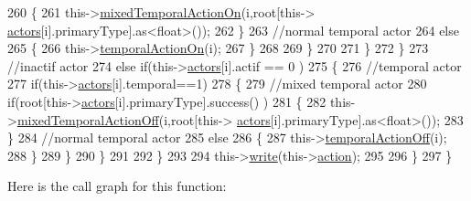 \begin{DoxyCode}
260                         \{
261                             this->\hyperlink{class_jetpack_af44bc8a08818e4433dfb1c7104601f12}{mixedTemporalActionOn}(i,root[this->
      \hyperlink{class_jetpack_a7e16d2f97837f9712a2e6de1c50d99db}{actors}[i].primaryType].as<float>());
262                         \}
263                         \textcolor{comment}{//normal temporal actor}
264                         \textcolor{keywordflow}{else}
265                         \{
266                             this->\hyperlink{class_jetpack_ad011d904f639accb5f94ef806846ef59}{temporalActionOn}(i);
267                         \}
268                                             
269                     \}
270 
271                 \}
272             \}
273             \textcolor{comment}{//inactif actor}
274             \textcolor{keywordflow}{else} \textcolor{keywordflow}{if}(this->\hyperlink{class_jetpack_a7e16d2f97837f9712a2e6de1c50d99db}{actors}[i].actif == 0 )
275             \{
276                 \textcolor{comment}{//temporal actor}
277                 \textcolor{keywordflow}{if}(this->\hyperlink{class_jetpack_a7e16d2f97837f9712a2e6de1c50d99db}{actors}[i].temporal==1)
278                 \{
279                     \textcolor{comment}{//mixed temporal actor}
280                     \textcolor{keywordflow}{if}(root[this->\hyperlink{class_jetpack_a7e16d2f97837f9712a2e6de1c50d99db}{actors}[i].primaryType].success() )
281                     \{
282                         this->\hyperlink{class_jetpack_af2f567ef6311a8fc2f7bb948837667b7}{mixedTemporalActionOff}(i,root[this->
      \hyperlink{class_jetpack_a7e16d2f97837f9712a2e6de1c50d99db}{actors}[i].primaryType].as<float>());
283                     \}
284                     \textcolor{comment}{//normal temporal actor}
285                     \textcolor{keywordflow}{else}
286                     \{
287                         this->\hyperlink{class_jetpack_a2991b302cd99bf89325f9b66b104d575}{temporalActionOff}(i);
288                     \}
289                 \}           
290             \}
291 
292         \}
293 
294         this->\hyperlink{class_jetpack_a338f1af8cbc6504ac69b47c7328569b5}{write}(this->\hyperlink{class_jetpack_aca3142925a7b0834b34ae91d26af7765}{action});
295 
296     \} 
297 \}
\end{DoxyCode}
Here is the call graph for this function\+:\nopagebreak
